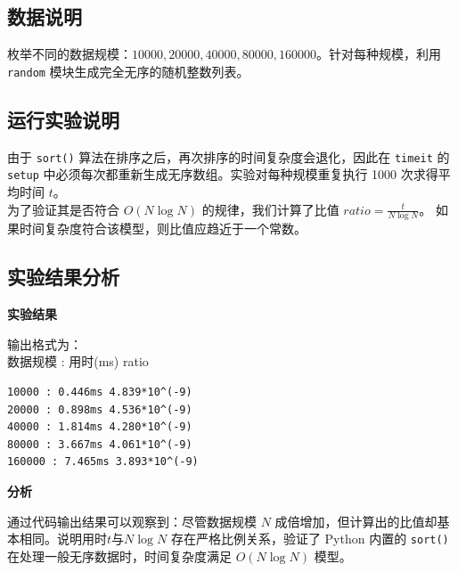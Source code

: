 \documentclass[a4paper, 11pt]{ctexart}
\begin{document}
\subsection*{数据说明}
枚举不同的数据规模：$10000, 20000, 40000, 80000, 160000$。针对每种规模，利用 \texttt{random} 模块生成完全无序的随机整数列表。

\subsection*{运行实验说明}
由于 \texttt{sort()} 算法在排序之后，再次排序的时间复杂度会退化，因此在 \texttt{timeit} 的 \texttt{setup} 中必须每次都重新生成无序数组。实验对每种规模重复执行 1000 次求得平均时间 $t$。\\

为了验证其是否符合 $O(N \log N)$ 的规律，我们计算了比值 $ratio = \frac{t}{N \log N}$。 如果时间复杂度符合该模型，则比值应趋近于一个常数。

\subsection*{实验结果分析}
\textbf{实验结果}

输出格式为：\\
数据规模 : 用时(ms) ratio\\
\vspace{-2em}
\begin{verbatim}
10000 : 0.446ms 4.839*10^(-9)
20000 : 0.898ms 4.536*10^(-9)
40000 : 1.814ms 4.280*10^(-9)
80000 : 3.667ms 4.061*10^(-9)
160000 : 7.465ms 3.893*10^(-9)
\end{verbatim}

\textbf{分析}

通过代码输出结果可以观察到：尽管数据规模 $N$ 成倍增加，但计算出的比值却基本相同。说明用时$t$与$N \log N$ 存在严格比例关系，验证了 Python 内置的 \texttt{sort()}在处理一般无序数据时，时间复杂度满足 $O(N \log N)$ 模型。
\end{document}
